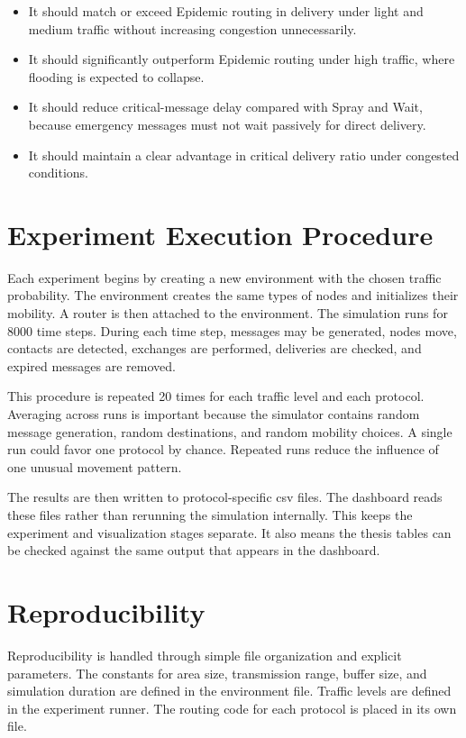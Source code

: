 \begin{itemize}
	\item It should match or exceed Epidemic routing in delivery under light and medium traffic without increasing congestion unnecessarily.
	\item It should significantly outperform Epidemic routing under high traffic, where flooding is expected to collapse.
	\item It should reduce critical-message delay compared with Spray and Wait, because emergency messages must not wait passively for direct delivery.
	\item It should maintain a clear advantage in critical delivery ratio under congested conditions.
\end{itemize}

\section{Experiment Execution Procedure}
Each experiment begins by creating a new environment with the chosen traffic probability. The environment creates the same types of nodes and initializes their mobility. A router is then attached to the environment. The simulation runs for 8000 time steps. During each time step, messages may be generated, nodes move, contacts are detected, exchanges are performed, deliveries are checked, and expired messages are removed.

This procedure is repeated 20 times for each traffic level and each protocol. Averaging across runs is important because the simulator contains random message generation, random destinations, and random mobility choices. A single run could favor one protocol by chance. Repeated runs reduce the influence of one unusual movement pattern.

The results are then written to protocol-specific \ac{csv} files. The dashboard reads these files rather than rerunning the simulation internally. This keeps the experiment and visualization stages separate. It also means the thesis tables can be checked against the same output that appears in the dashboard.

\section{Reproducibility}
Reproducibility is handled through simple file organization and explicit parameters. The constants for area size, transmission range, buffer size, and simulation duration are defined in the environment file. Traffic levels are defined in the experiment runner. The routing code for each protocol is placed in its own file.

